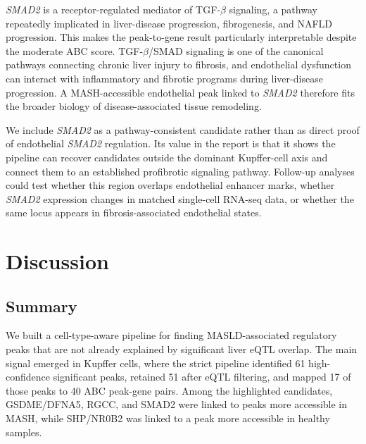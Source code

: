 \documentclass[11pt]{article}
\begin{document}
  \textit{SMAD2} is a receptor-regulated mediator of TGF-\(\beta\) signaling, a pathway repeatedly implicated in liver-disease progression, fibrogenesis, and NAFLD progression\cite{Dooley2012TGFB,Yang2014TGFBSignaling}.
  This makes the peak-to-gene result particularly interpretable despite the moderate ABC score.
  TGF-\(\beta\)/SMAD signaling is one of the canonical pathways connecting chronic liver injury to fibrosis, and endothelial dysfunction can interact with inflammatory and fibrotic programs during liver-disease progression.
  A MASH-accessible endothelial peak linked to \textit{SMAD2} therefore fits the broader biology of disease-associated tissue remodeling.

  We include \textit{SMAD2} as a pathway-consistent candidate rather than as direct proof of endothelial \textit{SMAD2} regulation.
  Its value in the report is that it shows the pipeline can recover candidates outside the dominant Kupffer-cell axis and connect them to an established profibrotic signaling pathway.
  Follow-up analyses could test whether this region overlaps endothelial enhancer marks, whether \textit{SMAD2} expression changes in matched single-cell RNA-seq data, or whether the same locus appears in fibrosis-associated endothelial states.

  \FloatBarrier

  \section{Discussion}\label{sec:discussion}

  \subsection{Summary}\label{subsec:summary}
  We built a cell-type-aware pipeline for finding MASLD-associated regulatory peaks that are not already explained by significant liver eQTL overlap.
  The main signal emerged in Kupffer cells, where the strict pipeline identified 61 high-confidence significant peaks, retained 51 after eQTL filtering, and mapped 17 of those peaks to 40 ABC peak-gene pairs.
  Among the highlighted candidates, GSDME/DFNA5, RGCC, and SMAD2 were linked to peaks more accessible in MASH, while SHP/NR0B2 was linked to a peak more accessible in healthy samples.
\end{document}
